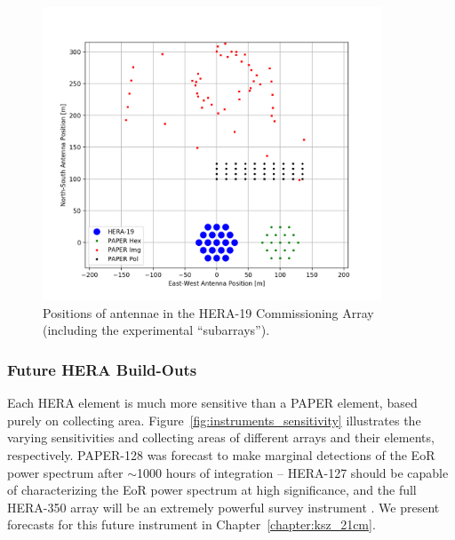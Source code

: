\begin{figure}
\centering
\includegraphics[width=0.9\textwidth]{chapters/instruments/figures/h19layout.png}
\caption{Positions of antennae in the HERA-19 Commissioning Array (including the experimental ``subarrays'').}
\label{fig:instruments_hera19_layout}
\end{figure}

\subsubsection{Future HERA Build-Outs}

Each HERA element is much more sensitive than a PAPER element, based purely on collecting area. Figure~\ref{fig:instruments_sensitivity} illustrates the varying sensitivities and collecting areas of different arrays and their elements, respectively. PAPER-128 was forecast to make marginal detections of the EoR power spectrum after $\sim$1000 hours of integration -- HERA-127 should be capable of characterizing the EoR power spectrum at high significance, and the full HERA-350 array will be an extremely powerful survey instrument \citep[e.g.][]{PoberMemo}. We present forecasts for this future instrument in Chapter~\ref{chapter:ksz_21cm}.

